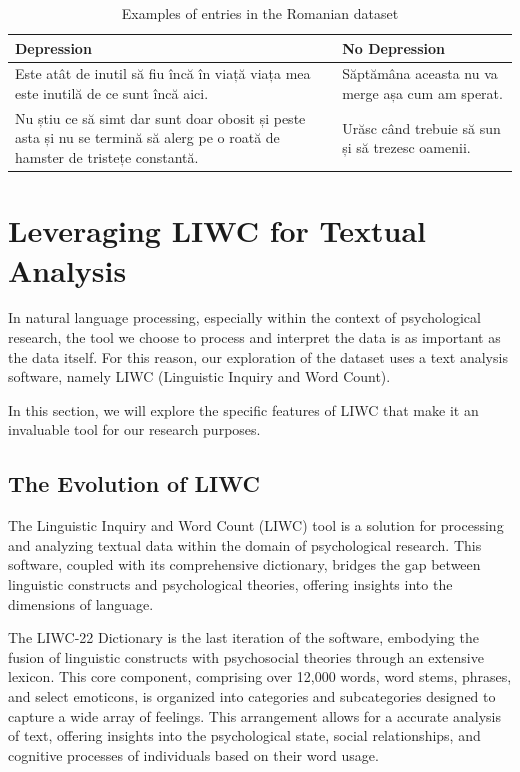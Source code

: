 \begin{table}[ht]
\centering
\renewcommand{\arraystretch}{1.5} %
\begin{adjustbox}{width=\textwidth}
\begin{tabular}{|p{}|p{}|} %
\hline
\textbf{Depression} & \textbf{No Depression} \\ \hline
Este atât de inutil să fiu încă în viață viața mea este inutilă de ce sunt încă aici. & Săptămâna aceasta nu va merge așa cum am sperat.\\ \hline
Nu știu ce să simt dar sunt doar obosit și peste asta și nu se termină să alerg pe o roată de hamster de tristețe constantă. & Urăsc când trebuie să sun și să trezesc oamenii. \\ \hline
\end{tabular}
\end{adjustbox}
\caption{Examples of entries in the Romanian dataset}
\label{datasetRomanianExamples}
\end{table}


\section{Leveraging LIWC for Textual Analysis}

\quad In natural language processing, especially within the context of psychological research, the tool we choose to process and interpret the data is as important as the data itself. For this reason, our exploration of the dataset uses a text analysis software, namely LIWC (Linguistic Inquiry and Word Count).

In this section, we will explore the specific features of LIWC that make it an invaluable tool for our research purposes. 


\subsection{The Evolution of LIWC}

\quad The Linguistic Inquiry and Word Count (LIWC) tool is a solution for processing and analyzing textual data within the domain of psychological research. This software, coupled with its comprehensive dictionary, bridges the gap between linguistic constructs and psychological theories, offering insights into the dimensions of language.

\quad The LIWC-22 Dictionary is the last iteration of the software, embodying the fusion of linguistic constructs with psychosocial theories through an extensive lexicon. This core component, comprising over 12,000 words, word stems, phrases, and select emoticons, is organized into categories and subcategories designed to capture a wide array of feelings. This arrangement allows for a accurate analysis of text, offering insights into the psychological state, social relationships, and cognitive processes of individuals based on their word usage.


